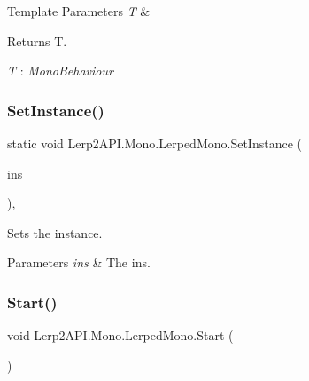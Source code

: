 \begin{DoxyTemplParams}{Template Parameters}
{\em T} & \\
\hline
\end{DoxyTemplParams}
\begin{DoxyReturn}{Returns}
T.
\end{DoxyReturn}
\begin{Desc}
\item[Type Constraints]\begin{description}
\item[{\em T} : {\em Mono\+Behaviour}]\end{description}
\end{Desc}
\mbox{\label{class_lerp2_a_p_i_1_1_mono_1_1_lerped_mono_ae990bb6044872631869b3279e875f1a2}} 
\subsubsection{\texorpdfstring{Set\+Instance()}{SetInstance()}}
{\footnotesize\ttfamily static void Lerp2\+A\+P\+I.\+Mono.\+Lerped\+Mono.\+Set\+Instance (\begin{DoxyParamCaption}\item[{\hyperlink{class_lerp2_a_p_i_1_1_mono_1_1_lerped_mono}{Lerped\+Mono}}]{ins }\end{DoxyParamCaption})\hspace{0.3cm}{\ttfamily [inline]}, {\ttfamily [static]}}



Sets the instance. 


\begin{DoxyParams}{Parameters}
{\em ins} & The ins.\\
\hline
\end{DoxyParams}
\mbox{\label{class_lerp2_a_p_i_1_1_mono_1_1_lerped_mono_adb4749c8a1e4c6b7d38e60c2884a1d49}} 
\subsubsection{\texorpdfstring{Start()}{Start()}}
{\footnotesize\ttfamily void Lerp2\+A\+P\+I.\+Mono.\+Lerped\+Mono.\+Start (\begin{DoxyParamCaption}{ }\end{DoxyParamCaption})\hspace{0.3cm}{\ttfamily [inline]}}



